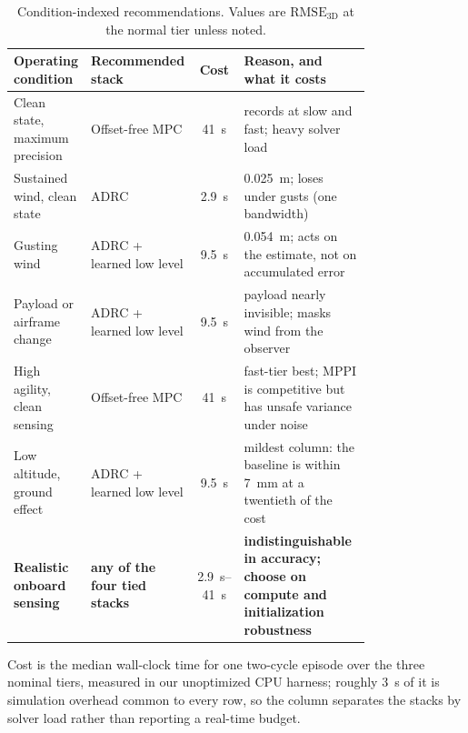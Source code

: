 \begin{table}[t]
\caption{Condition-indexed recommendations. Values are
$\mathrm{RMSE}_{\mathrm{3D}}$ at the normal tier unless noted.}
\label{tab:recommend}
\begin{center}\small
\begin{tabular}{@{}p{0.21\linewidth} p{0.21\linewidth} c p{0.36\linewidth}@{}}
\toprule
Operating condition & Recommended stack & Cost & Reason, and what it costs \\
\midrule
Clean state, maximum precision & Offset-free MPC & \SI{41}{\second} & records at slow and fast; heavy solver load \\
Sustained wind, clean state    & ADRC & \SI{2.9}{\second} & \SI{0.025}{\meter}; loses under gusts (one bandwidth) \\
Gusting wind                   & ADRC + learned low level & \SI{9.5}{\second} & \SI{0.054}{\meter}; acts on the estimate, not on accumulated error \\
Payload or airframe change     & ADRC + learned low level & \SI{9.5}{\second} & payload nearly invisible; masks wind from the observer \\
High agility, clean sensing    & Offset-free MPC & \SI{41}{\second} & fast-tier best; MPPI is competitive but has unsafe variance under noise \\
Low altitude, ground effect    & ADRC + learned low level & \SI{9.5}{\second} & mildest column: the baseline is within \SI{7}{\milli\meter} at a twentieth of the cost \\
\textbf{Realistic onboard sensing} & \textbf{any of the four tied stacks} & \SIrange{2.9}{41}{\second} & \textbf{indistinguishable in accuracy; choose on compute and initialization robustness} \\
\bottomrule
\end{tabular}
\end{center}
{\footnotesize Cost is the median wall-clock time for one two-cycle episode over the
three nominal tiers, measured in our unoptimized CPU harness; roughly \SI{3}{\second} of
it is simulation overhead common to every row, so the column separates the stacks by
solver load rather than reporting a real-time budget.\par}
\end{table}
